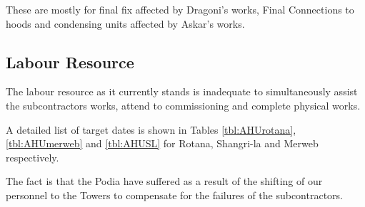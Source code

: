 These are mostly for final fix affected by Dragoni's works, Final Connections to hoods and condensing units affected by Askar's works.

\subsection{Labour Resource}

The labour resource as it currently stands is inadequate to simultaneously assist the subcontractors works, attend to commissioning and complete physical works.

A detailed list of target dates is shown in Tables \ref{tbl:AHUrotana}, \ref{tbl:AHUmerweb} and \ref{tbl:AHUSL} for Rotana, Shangri-la and Merweb respectively. 

The fact is that the Podia have suffered as a result of the shifting of our personnel to the Towers to compensate for the failures of the subcontractors. 


